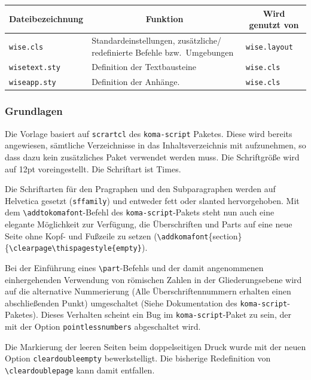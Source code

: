 \documentclass[english, trackchanges, hyperref, ngerman ,pdf, mp, mppdf]{wise}
\newcommand\code[1]{\texttt{#1}}
\newcommand\command[1]{\code{\textbackslash{}#1}}
\begin{document}
\vspace{0.375cm}
\begin{center}\begin{tabular}{|l|p{7cm}|l|}
\hline 
\multicolumn{1}{|c|}{\textbf{Dateibezeichnung}}&
\multicolumn{1}{c|}{\textbf{Funktion}}&
\multicolumn{1}{c|}{\textbf{Wird genutzt von}}\\
\hline
\hline 
\code{wise.cls} &
Standardeinstellungen, zusätzliche/ redefinierte Befehle bzw.\ Umgebungen&
\code{wise.layout}\\
\hline 
\code{wisetext.sty}&
Definition der Textbausteine&
\code{wise.cls}\\
\hline
\code{wiseapp.sty}&
Definition der Anhänge.&
\code{wise.cls}\\
\hline
\end{tabular}\end{center}
\vspace{0.375cm}


\subsubsection{Grundlagen}

Die Vorlage basiert auf \code{scrartcl} des \code{koma-script}
Paketes. Diese wird bereits angewiesen, sämtliche Verzeichnisse in
das Inhaltsverzeichnis mit aufzunehmen, so dass dazu kein zusätzliches
Paket verwendet werden muss. Die Schriftgröße wird auf 12pt voreingestellt.
Die Schriftart ist Times.

Die Schriftarten für den Pragraphen und den Subparagraphen werden auf
Helvetica gesetzt (\code{sffamily}) und entweder fett oder slanted
hervorgehoben. Mit dem \command{addtokomafont}-Befehl des
\code{koma-script}-Pakets steht nun auch eine elegante Möglichkeit zur
Verfügung, die Überschriften und Parts auf eine neue Seite ohne Kopf-
und Fußzeile zu setzen \linebreak{}
(\command{addkomafont}\{section\}\{\command{clearpage}\command{thispagestyle\{empty\}}).

Bei der Einführung eines \command{part}-Befehls und
der damit angenommenen einhergehenden Verwendung von römischen Zahlen
in der Gliederungsebene wird auf die alternative Nummerierung (Alle
Überschriftennummern erhalten einen abschließenden Punkt) umgeschaltet
(Siehe Dokumentation des \code{koma-script}-Paketes). Dieses Verhalten
scheint ein Bug im \code{koma-script}-Paket zu sein, der mit der
Option \code{pointlessnumbers} abgeschaltet wird.

Die Markierung der leeren Seiten beim doppelseitigen Druck wurde mit
der neuen Option \code{cleardoubleempty} bewerkstelligt. Die bisherige
Redefinition von \command{cleardoublepage} kann damit
entfallen.
\end{document}
